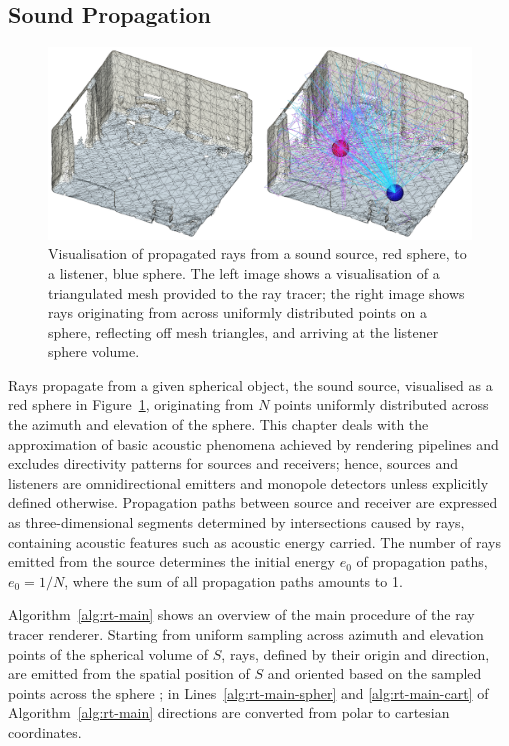 \subsection{Sound Propagation}
\begin{figure}
    \centering
    \includegraphics[width=1\linewidth]{rt-room-test}
    \caption{Visualisation of propagated rays from a sound source, red sphere, to a listener, blue sphere. The left image shows a visualisation of a triangulated mesh provided to the ray tracer; the right image shows rays originating from across uniformly distributed points on a sphere, reflecting off mesh triangles, and arriving at the listener sphere volume.}
    \label{fig:rt-room-demo}
\end{figure}
Rays propagate from a given spherical object, the sound source, visualised as a red sphere in Figure~\ref{fig:rt-room-demo}, originating from $N$ points uniformly distributed across the azimuth and elevation of the sphere. This chapter deals with the approximation of basic acoustic phenomena achieved by rendering pipelines and excludes directivity patterns for sources and receivers; hence, sources and listeners are omnidirectional emitters and monopole detectors unless explicitly defined otherwise. Propagation paths between source and receiver are expressed as three-dimensional segments determined by intersections caused by rays, containing acoustic features such as acoustic energy carried. The number of rays emitted from the source determines the initial energy $e_0$ of propagation paths, $e_0 = 1 / N$, where the sum of all propagation paths amounts to 1. \par
Algorithm~\ref{alg:rt-main} shows an overview of the main procedure of the ray tracer renderer. Starting from uniform sampling across azimuth and elevation points of the spherical volume of $S$, rays, defined by their origin and direction, are emitted from the spatial position of $S$ and oriented based on the sampled points across the sphere \citep{shirley2008realistic}; in Lines~\ref{alg:rt-main-spher} and \ref{alg:rt-main-cart} of Algorithm~\ref{alg:rt-main} directions are converted from polar to cartesian coordinates.\par


